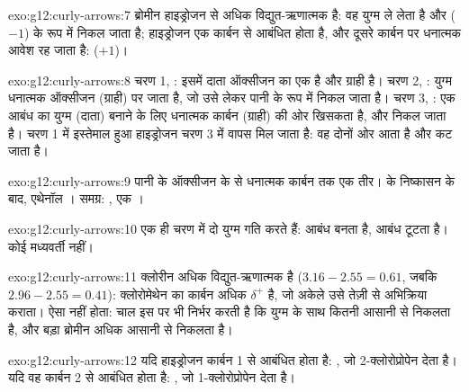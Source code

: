 \begin{solution}{exo:g12:curly-arrows:7}
ब्रोमीन हाइड्रोजन से अधिक विद्युत-ऋणात्मक है: वह युग्म ले लेता है और
 ($-1$) के रूप में निकल जाता है; हाइड्रोजन एक कार्बन से आबंधित होता है, और दूसरे
कार्बन पर धनात्मक आवेश रह जाता है:  ($+1$)।
\end{solution}

\begin{solution}{exo:g12:curly-arrows:8}
चरण 1, : इसमें दाता ऑक्सीजन का एक  है और ग्राही  है। चरण 2, :
 युग्म धनात्मक ऑक्सीजन (ग्राही) पर जाता है, जो उसे लेकर
पानी के रूप में निकल जाता है। चरण 3, : एक  आबंध का युग्म
(दाता)  बनाने के लिए धनात्मक कार्बन (ग्राही) की ओर खिसकता है,
और  निकल जाता है। चरण 1 में इस्तेमाल हुआ हाइड्रोजन  चरण
3 में वापस मिल जाता है: वह दोनों ओर आता है और कट जाता है।
\end{solution}

\begin{solution}{exo:g12:curly-arrows:9}
पानी के ऑक्सीजन के  से धनात्मक कार्बन तक एक तीर।
 के निष्कासन के बाद, एथेनॉल । समग्र:
, एक ।
\end{solution}

\begin{solution}{exo:g12:curly-arrows:10}
एक ही चरण में दो युग्म गति करते हैं:  आबंध बनता है, 
आबंध टूटता है। कोई मध्यवर्ती नहीं।
\end{solution}

\begin{solution}{exo:g12:curly-arrows:11}
क्लोरीन अधिक विद्युत-ऋणात्मक है ($3.16 - 2.55 = 0.61$, जबकि
$2.96 - 2.55 = 0.41$): क्लोरोमेथेन का कार्बन अधिक
$\delta^+$ है, जो अकेले उसे तेज़ी से अभिक्रिया कराता। ऐसा नहीं होता:
चाल इस पर भी निर्भर करती है कि  युग्म के साथ कितनी आसानी से निकलता है, और
बड़ा ब्रोमीन अधिक आसानी से निकलता है।
\end{solution}

\begin{solution}{exo:g12:curly-arrows:12}
यदि हाइड्रोजन कार्बन 1 से आबंधित होता है: , जो
2-क्लोरोप्रोपेन  देता है। यदि वह कार्बन 2 से आबंधित होता है:
, जो 1-क्लोरोप्रोपेन  देता है।
\end{solution}

